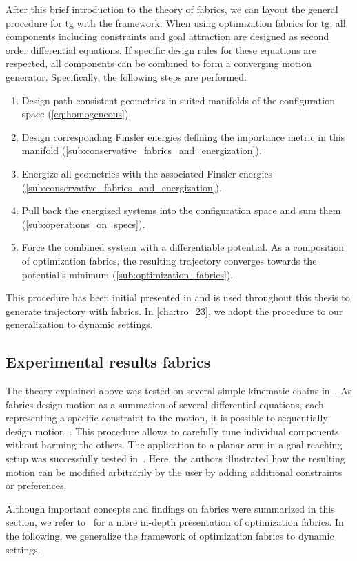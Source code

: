 After this brief introduction to the theory of \ac{fabrics},
we can layout the general procedure for \ac{tg} with the
framework.
When using optimization fabrics for \ac{tg}, all
components including constraints and goal attraction are
designed as second order differential equations. If specific
design rules for these equations are respected, all
components can be combined to form a converging motion
generator. Specifically, the following steps are performed:
%
\begin{enumerate}
  \item Design path-consistent geometries in suited manifolds of the configuration space
    (\cref{eq:homogeneous}).
  \item Design corresponding Finsler energies defining the importance metric in this manifold
    (\cref{sub:conservative_fabrics_and_energization}).
  \item Energize all geometries with the associated Finsler energies 
    (\cref{sub:conservative_fabrics_and_energization}).
  \item Pull back the energized systems into the configuration space and sum them 
    (\cref{sub:operations_on_specs}).
  \item Force the combined system with a differentiable potential. As a composition of optimization fabrics, 
    the resulting trajectory converges towards the potential's minimum
    (\cref{sub:optimization_fabrics}).
\end{enumerate}

This procedure has been initial presented in
\cite{Ratliff2020} and is used throughout this thesis to
generate trajectory with \ac{fabrics}. In \cref{cha:tro_23},
we adopt the procedure to our generalization to dynamic
settings.

\subsection{Experimental results fabrics}%
\label{sub:experimental_results_fabrics}

The theory explained above was tested on several simple kinematic chains
in~\cite{Ratliff2020,Ratliff2021}. As fabrics design motion as a summation of several
differential equations, each representing a specific constraint to the motion, it is
possible to sequentially design motion~\cite{Ratliff2020}. This procedure allows to
carefully tune individual components without harming the others. The application to a
planar arm in a goal-reaching setup was successfully tested in~\cite{Ratliff2020}. Here,
the authors illustrated how the resulting motion can be modified arbitrarily by the user
by adding additional constraints or preferences.

Although important concepts and findings on \ac{fabrics} were summarized in this
section, we refer to~\cite{Ratliff2020} for a more in-depth presentation of optimization
fabrics. In the following, we generalize the framework of optimization fabrics to dynamic settings.
